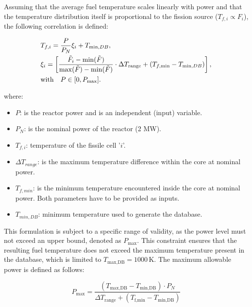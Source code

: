 \documentclass[preprint,review,12pt]{elsarticle}
\begin{document}
Assuming that the average fuel temperature scales linearly with power and that the temperature distribution itself is proportional to the fission source ($T_{f,i} \propto F_{i} $), the following correlation is defined:


\begin{align}
 &T_{f,i} =  \frac{P}{P_N} \xi_i  + T_{\min,DB},
\label{eq:correction_power_temperature} \\ &
\xi_i= \left[ \frac{\tilde{F}_i - \min(\tilde{F})}{\max(\tilde{F}) - \min(\tilde{F})} \cdot \Delta T_{\text{range}} + (T_{f,\min} - T_{\min,DB}) \right],
\notag \\ &
 \text{with} \quad P \in [0,P_{\text{max}}]. \notag
\end{align}


where: 

\begin{itemize}
    \item $P$: is the reactor power and is an independent (input) variable.
    \item $P_N$: is the nominal power of the reactor (2 MW). 
    \item $T_{f,i}$: temperature of the fissile cell '$i$'. 
    \item $\Delta T_{range} $: is the maximum temperature difference within the core at nominal power. 
    \item $T_{f,min}$: is the minimum temperature encountered inside the core at nominal power. Both parameters have to be provided as inputs.  
    \item $T_{min,DB}$: minimum temperature used to generate the database.   
\end{itemize}

This formulation is subject to a specific range of validity, as the power level must not exceed an upper bound, denoted as \( P_{\text{max}} \). This constraint ensures that the resulting fuel temperature does not exceed the maximum temperature present in the database, which is limited to \( T_{\text{max,DB}} = 1000\,\text{K} \). The maximum allowable power is defined as follows:

\begin{equation}
P_{\text{max}} = \frac{(T_{\text{max,DB}} - T_{\text{min,DB}})\cdot P_N}{\Delta T_{\text{range}} + (T_{\text{f,min}} - T_{\text{min,DB}})}
\label{eq:maximum_power_formulation}
\end{equation}

\end{document}
